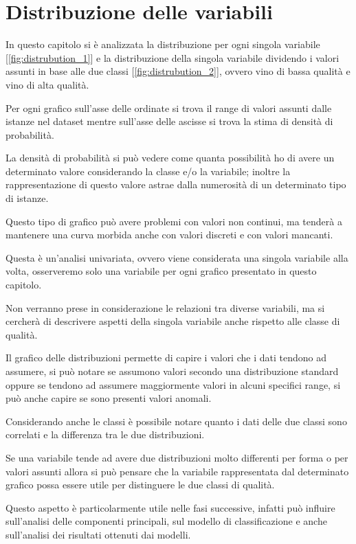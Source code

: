 \section{Distribuzione delle variabili}
In questo capitolo si è analizzata la distribuzione per ogni singola variabile [\ref{fig:distrubution_1}] e la distribuzione della singola variabile dividendo i valori assunti in base alle due classi [\ref{fig:distrubution_2}], ovvero vino di bassa qualità e vino di alta qualità.

\noindent
Per ogni grafico sull'asse delle ordinate si trova il range di valori assunti dalle istanze nel dataset mentre sull'asse delle ascisse si trova la stima di densità di probabilità.

\noindent
La densità di probabilità si può vedere come quanta possibilità ho di avere un determinato valore considerando la classe e/o la variabile; inoltre la rappresentazione di questo valore astrae dalla numerosità di un determinato tipo di istanze.

\noindent
Questo tipo di grafico può avere problemi con valori non continui, ma tenderà a mantenere una curva morbida anche con valori discreti e con valori mancanti.

\noindent
Questa è un'analisi univariata, ovvero viene considerata una singola variabile alla volta, osserveremo solo una variabile per ogni grafico presentato in questo capitolo.

\noindent
Non verranno prese in considerazione le relazioni tra diverse variabili, ma si cercherà di descrivere aspetti della singola variabile anche rispetto alle classe di qualità.

\noindent
Il grafico delle distribuzioni permette di capire i valori che i dati tendono ad assumere, si può notare se assumono valori secondo una distribuzione standard oppure se tendono ad assumere maggiormente valori in alcuni specifici range, si può anche capire se sono presenti valori anomali.

\noindent
Considerando anche le classi è possibile notare quanto i dati delle due classi sono correlati e la differenza tra le due distribuzioni.

\noindent
Se una variabile tende ad avere due distribuzioni molto differenti per forma o per valori assunti allora si può pensare che la variabile rappresentata dal determinato grafico possa essere utile per distinguere le due classi di qualità.

\noindent
Questo aspetto è particolarmente utile nelle fasi successive, infatti può influire sull'analisi delle componenti principali, sul modello di classificazione e anche sull'analisi dei risultati ottenuti dai modelli.

